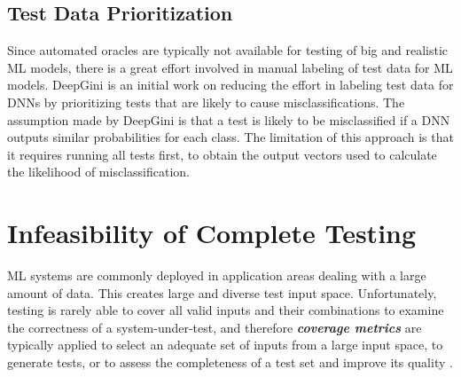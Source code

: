 \documentclass[letterpaper]{article} %
\begin{document}
\subsection{Test Data Prioritization}
Since automated oracles are typically not available for testing of big and realistic ML models, there is a great effort involved in manual labeling of test data for ML models. DeepGini \cite{Shi2019} is an initial work on reducing the effort in labeling test data for DNNs by prioritizing tests that are likely to cause misclassifications. The assumption made by DeepGini is that a test is likely to be misclassified if a DNN outputs similar probabilities for each class. The limitation of this approach is that it requires running all tests first, to obtain the output vectors used to calculate the likelihood of misclassification.

\section{Infeasibility of Complete Testing}
ML systems are commonly deployed in application areas dealing with a large amount of data. This creates large and diverse test input space. Unfortunately, testing is rarely able to cover all valid inputs and their combinations to examine the correctness of a system-under-test, and therefore \textit{\textbf{coverage metrics}} are typically applied to select an adequate set of inputs from a large input space, to generate tests, or to assess the completeness of a test set and improve its quality \cite{Marijan2019,Marijan18}. 
\end{document}
